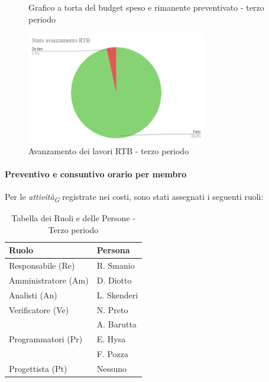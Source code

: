 \begin{figure}[H]
    \centering
    \begin{minipage}[b]{0.45\textwidth}
        \centering
        \caption{Grafico a torta del budget speso e rimanente preventivato - terzo periodo}
        \label{fig:Budget_speso_3}
    \end{minipage}
    
    \vspace{1cm}

    \begin{minipage}[b]{0.70\textwidth}
        \centering
        \includegraphics[width=0.7\textwidth]{../Images/avanzamento3Periodo.png}
        \caption{Avanzamento dei lavori RTB - terzo periodo}
        \label{fig:Avanzamento_RTB_3}
    \end{minipage}
\end{figure}

\paragraph{Preventivo e consuntivo orario per membro} \hspace{1pt}
Per le \textit{attività}\textsubscript{\textit{G}} registrate nei costi, sono stati assegnati i seguenti ruoli:  

\begin{table}[H]
    \centering
    \begin{tabular}{|l|l|}
    \hline
    \textbf{Ruolo} & \textbf{Persona} \\
    \hline
    \hline
    Responsabile (Re) & R. Smanio \\
    \hline
    Amministratore (Am) & D. Diotto \\
    \hline
    Analisti (An) & L. Skenderi \\
    \hline
    Verificatore (Ve) & N. Preto \\
     & A. Barutta \\
     \hline
    Programmatori (Pr) & E. Hysa \\
     & F. Pozza \\
     \hline
    Progettista (Pt) & Nessuno \\
    \hline
    \end{tabular}
    \caption{Tabella dei Ruoli e delle Persone - Terzo periodo}
    \label{tab:Ruoli_persone_3}
    \end{table}
    

